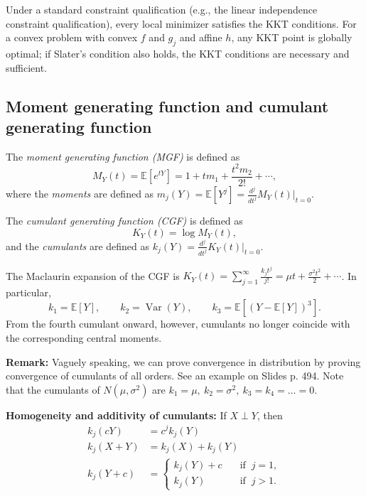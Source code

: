 \documentclass{article}
\theoremstyle{break}
\newcommand{\E}{\ensuremath{\mathbb{E}}}
\DeclareMathOperator{\Var}{Var}
\begin{document}
Under a standard constraint qualification (e.g., the linear independence constraint qualification), every local minimizer satisfies the KKT conditions.
For a convex problem with convex $f$ and $g_j$ and affine $h$, any KKT point is globally optimal; if Slater's condition also holds, the KKT conditions are necessary and sufficient.


\subsection{Moment generating function and cumulant generating function}\label{sec:misc-mgf-and-cgf}
The \emph{moment generating function (MGF)} is defined as 
\[
M_Y(t) = \E[e^{tY}] = 1 + t m_1 + \frac{t^2 m_2}{2!} + \cdots,
\] 
where the \emph{moments} are defined as $m_j(Y) = \E[Y^j] = \frac{d^j}{dt^j}M_Y(t) \Big|_{t=0}$.

The \emph{cumulant generating function (CGF)} is defined as 
\[
K_Y(t) = \log M_Y(t),
\] 
and the \emph{cumulants} are defined as $k_j(Y) = \frac{d^j}{dt^j} K_Y(t) \Big|_{t=0}$. 

The Maclaurin expansion of the CGF is $K_Y(t) = \sum_{j=1}^\infty\frac{k_j t^j}{j!} = \mu t + \frac{\sigma^2 t^2}{2} + \cdots$. 
In particular,
\[
    k_1 = \E[Y], 
    \qquad 
    k_2 = \Var(Y), 
    \qquad
    k_3 = \E[(Y-\E[Y])^3].
\]
From the fourth cumulant onward, however, cumulants no longer coincide with the corresponding central moments.

\textbf{Remark:} Vaguely speaking, we can prove convergence in distribution by proving convergence of cumulants of all orders. See an example on Slides p. 494. Note that the cumulants of $N(\mu, \sigma^2)$ are $k_1 = \mu,\ k_2 = \sigma^2,\ k_3 = k_4 = \ldots = 0$.

\textbf{Homogeneity and additivity of cumulants:} If $X \perp Y$, then
\begin{align*}
    k_j(cY) &= c^j k_j(Y)\\
    k_j(X+Y) &= k_j(X) + k_j(Y)\\
    k_j(Y+c) &= \begin{cases}
        k_j(Y) + c \quad &\text{if }\ j = 1,\\
        k_j(Y) \quad &\text{if }\ j > 1.
    \end{cases}
\end{align*}
\end{document}
